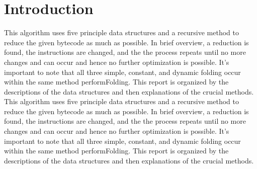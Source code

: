 \section{Introduction}

This algorithm uses five principle data structures and a recursive method to reduce the given bytecode as much as possible. In brief overview, a reduction is found, the instructions are changed, and the the process repeats until no more changes and can occur and hence no further optimization is possible.  It’s important to note that all three simple, constant, and dynamic folding occur within the same method performFolding.  This report is organized by the descriptions of the data structures and then explanations of the crucial methods. This algorithm uses five principle data structures and a recursive method to reduce the given bytecode as much as possible. In brief overview, a reduction is found, the instructions are changed, and the the process repeats until no more changes and can occur and hence no further optimization is possible.  It’s important to note that all three simple, constant, and dynamic folding occur within the same method performFolding.  This report is organized by the descriptions of the data structures and then explanations of the crucial methods. 